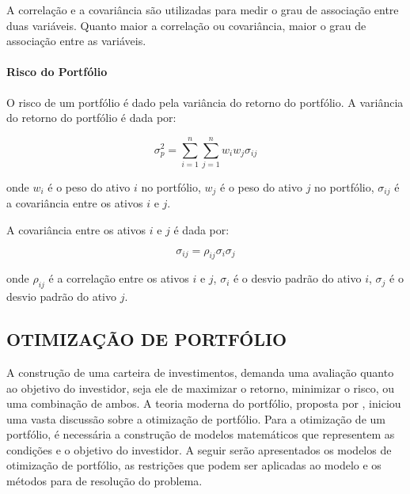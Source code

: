                 \ipar A correlação e a covariância são utilizadas para medir o grau de associação entre duas variáveis. Quanto maior a correlação ou covariância, maior o grau de associação entre as variáveis.

            \paragraph{Risco do Portfólio}

                \ipar O risco de um portfólio é dado pela variância do retorno do portfólio. A variância do retorno do portfólio é dada por:

                \begin{equation}
                    \label{eq:variancia}
                    \sigma_p^2 = \sum_{i=1}^{n} \sum_{j=1}^{n} w_i w_j \sigma_{ij}
                \end{equation}

                \noindent onde $w_i$ é o peso do ativo $i$ no portfólio, $w_j$ é o peso do ativo $j$ no portfólio, $\sigma_{ij}$ é a covariância entre os ativos $i$ e $j$.

                \ipar A covariância entre os ativos $i$ e $j$ é dada por:

                \begin{equation}
                    \label{eq:covariancia}
                    \sigma_{ij} = \rho_{ij} \sigma_i \sigma_j
                \end{equation}

                \noindent onde $\rho_{ij}$ é a correlação entre os ativos $i$ e $j$, $\sigma_i$ é o desvio padrão do ativo $i$, $\sigma_j$ é o desvio padrão do ativo $j$.

    \subsection{OTIMIZAÇÃO DE PORTFÓLIO}
        \label{sec:otimizacao}

        \ipar A construção de uma carteira de investimentos, demanda uma avaliação quanto ao objetivo do investidor, seja ele de maximizar o retorno, minimizar o risco, ou uma combinação de ambos. A teoria moderna do portfólio, proposta por \cite{markowitz1952portfolio}, iniciou uma vasta discussão sobre a otimização de portfólio. Para a otimização de um portfólio, é necessária a construção de modelos matemáticos que representem as condições e o objetivo do investidor. A seguir serão apresentados os modelos de otimização de portfólio, as restrições que podem ser aplicadas ao modelo e os métodos para de resolução do problema.
    
